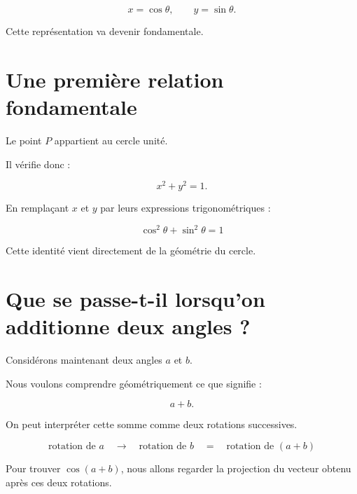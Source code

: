 \documentclass[11pt,a4paper]{article}
\newcommand{\sectiontitle}[1]{
    \section{#1}
}
\begin{document}
\[
x=\cos\theta,
\qquad
y=\sin\theta.
\]

Cette représentation va devenir fondamentale.


\sectiontitle{Une première relation fondamentale}

Le point $P$ appartient au cercle unité.

Il vérifie donc :

\[
x^2+y^2=1.
\]

En remplaçant $x$ et $y$ par leurs expressions trigonométriques :

\[
\boxed{
\cos^2\theta+\sin^2\theta=1
}
\]

Cette identité vient directement de la géométrie du cercle.


\sectiontitle{Que se passe-t-il lorsqu'on additionne deux angles ?}

Considérons maintenant deux angles $a$ et $b$.

Nous voulons comprendre géométriquement ce que signifie :

\[
a+b.
\]

On peut interpréter cette somme comme deux rotations successives.

\[
\boxed{
\text{rotation de }a
\quad\longrightarrow\quad
\text{rotation de }b
\quad=\quad
\text{rotation de }(a+b)
}
\]

Pour trouver $\cos(a+b)$, nous allons regarder la projection
du vecteur obtenu après ces deux rotations.

\end{document}

